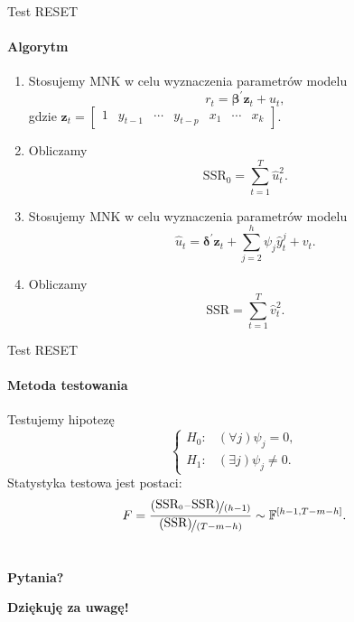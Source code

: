 \documentclass[a4paper, 11pt]{beamer}
\begin{document}
	\begin{frame}{Test RESET}
		\framesubtitle{Algorytm}
		\begin{enumerate}
			\item Stosujemy MNK w celu wyznaczenia parametrów modelu \[
					r_t = \boldsymbol{\beta}^{\prime} \boldsymbol{z}_t + u_t,
				\] gdzie $\boldsymbol{z}_{t} = \left[\begin{matrix}1 & y_{t-1} & \cdots & y_{t-p} & x_{1} & \cdots & x_{k}\end{matrix}\right].$
			\item Obliczamy \[
				\mbox{SSR}_0 = \sum_{t=1}^{T} \hat{u}_t^2.
			\]
			\item Stosujemy MNK w celu wyznaczenia parametrów modelu \[
					\hat{u}_t = \boldsymbol{\delta}^{\prime} \boldsymbol{z}_t + \sum_{j=2}^{h} \psi_j \hat{y}_t^j + v_t.
				\]
			\item Obliczamy \[
				\mbox{SSR} = \sum_{t=1}^{T} \hat{v}_t^2.
			\]
		\end{enumerate}
	\end{frame}
	
	\begin{frame}{Test RESET}
		\framesubtitle{Metoda testowania}
		Testujemy hipotezę \[
			\begin{cases}
				H_{0}: & \left(\forall j\right)\psi_{j}=0,\\
				H_{1}: & \left(\exists j\right)\psi_{j}\neq0.
			\end{cases}
		\]
		Statystyka testowa jest postaci: \[
			F=\frac{
				\nicefrac{\left(\mbox{SSR}_0 - \mbox{SSR}\right)}{\left(h-1\right)}
			}{
				\nicefrac{\left(\mbox{SSR}\right)}{\left(T-m-h\right)}
			} \sim \mathbb{F}^{\left[h-1, T-m-h\right]}.
		\]
	\end{frame}
	
	\section*{}
	
	\begin{frame}
		\center
		\Huge \bfseries
		Pytania?
	\end{frame}

	\begin{frame}
		\center
		\Huge \bfseries
		Dziękuję za uwagę!
	\end{frame}
\end{document}
